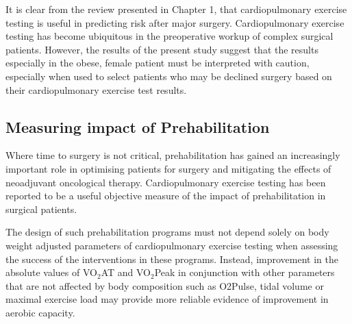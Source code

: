 It is clear from the review presented in Chapter 1, that cardiopulmonary exercise testing is useful in predicting risk after major surgery. Cardiopulmonary exercise testing has become ubiquitous in the preoperative workup of complex surgical patients. However, the results of the present study suggest that the results especially in the obese, female patient must be interpreted with caution, especially when used to select patients who may be declined surgery based on their cardiopulmonary exercise test results.

\subsection{Measuring impact of Prehabilitation}

Where time to surgery is not critical, prehabilitation has gained an increasingly important role in optimising patients for surgery and mitigating the effects of neoadjuvant oncological therapy. Cardiopulmonary exercise testing has been reported to be a useful objective measure of the impact of prehabilitation in surgical patients.\parencite{west_effect_2015}

The design of such prehabilitation programs must not depend solely on body weight adjusted parameters of cardiopulmonary exercise testing when assessing the success of the interventions in these programs. Instead, improvement in the absolute values of VO$_2$AT and VO$_2$Peak in conjunction with other parameters that are not affected by body composition such as O2Pulse, tidal volume\parencite{jones_effects_2007} or maximal exercise load may provide more reliable evidence of improvement in aerobic capacity.













